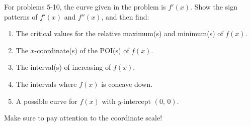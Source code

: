 For problems 5-10, the curve given in the problem is $f'(x)$. Show the sign patterns of $f'(x)$ and $f''(x)$, and then find: \par
\begin{enumerate}[label=\hspace{11pt}(\alph*), align=left, leftmargin=*, labelsep=0.25em]
    \item The critical values for the relative maximum(s) and minimum(s) of $f(x)$.
    \item The $x$-coordinate(s) of the POI(s) of $f(x)$.
    \item The interval(s) of increasing of $f(x)$.
    \item The intervals where $f(x)$ is concave down.
    \item A possible curve for $f(x)$ with $y$-intercept $(0, \, 0)$.
\end{enumerate} 
Make sure to pay attention to the coordinate scale! \\

